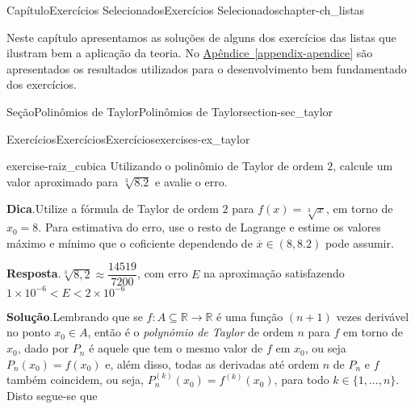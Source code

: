 \documentclass[oneside,10pt,]{book}
\newcommand{\blocktitlefont}{\relax}
\newcommand{\xreffont}{\relax}
\numberwithin{equation}{section}
\newcommand{\R}{\mathbb R}
\begin{document}
\begin{chapterptx}{Capítulo}{Exercícios Selecionados}{}{Exercícios Selecionados}{}{}{chapter-ch_listas}
\renewcommand*{\chaptername}{Capítulo}
\begin{introduction}{}%
Neste capítulo apresentamos as soluções de alguns dos exercícios das listas que ilustram bem a aplicação da teoria. No \hyperref[appendix-apendice]{Apêndice~{\xreffont\ref{appendix-apendice}}} são apresentados os resultados utilizados para o desenvolvimento bem fundamentado dos exercícios.%
\end{introduction}%
%
%
\typeout{************************************************}
\typeout{************************************************}
%
\begin{sectionptx}{Seção}{Polinômios de Taylor}{}{Polinômios de Taylor}{}{}{section-sec_taylor}
%
%
\typeout{************************************************}
\typeout{************************************************}
%
\begin{exercises-subsection-numberless}{Exercícios}{Exercícios}{}{Exercícios}{}{}{exercises-ex_taylor}
\begin{divisionexercise}{1}{}{}{exercise-raiz_cubica}%
Utilizando o polinômio de Taylor de ordem \(2\), calcule um valor aproximado para \(\sqrt[3]{8.2}\) e avalie o erro.%
\par\smallskip%
\noindent\textbf{\blocktitlefont Dica}.\hypertarget{hint-raiz_cubica-b}{}\quad{}Utilize a fórmula de Taylor de ordem \(2\) para \(f(x)=\sqrt[3]{x}\), em torno de \(x_0=8\). Para estimativa do erro, use o resto de Lagrange e estime os valores máximo e mínimo que o coficiente dependendo de \(\overline{x}\in(8,8.2)\) pode assumir.%
\par\smallskip%
\noindent\textbf{\blocktitlefont Resposta}.\hypertarget{answer-raiz_cubica-c}{}\quad{}\(\sqrt[3]{8,2}\approx \dfrac{14519}{7200}\), com erro \(E\) na aproximação satisfazendo \(1\times
10^{-6}<E <2\times 10^{-6}\)%
\par\smallskip%
\noindent\textbf{\blocktitlefont Solução}.\hypertarget{solution-raiz_cubica-d}{}\quad{}Lembrando que se \(f\colon A\subseteq\R\to\R\) é uma função \((n+1)\) vezes derivável no ponto \(x_0\in A\), então é o \emph{polynômio de Taylor} de ordem \(n\) para \(f\) em torno de \(x_0\), dado por \(P_n\) é aquele que tem o mesmo valor de \(f\) em \(x_0\), ou seja \(P_n(x_0)=f(x_0)\) e, além disso, todas as derivadas até ordem \(n\) de \(P_n\) e \(f\) também coincidem, ou seja, \(P_n^{(k)}(x_0)=f^{(k)}(x_0)\), para todo \(k\in\{1,\ldots,n\}\). Disto segue-se que%

\end{divisionexercise}
\end{exercises-subsection-numberless}
\end{sectionptx}
\end{chapterptx}
\end{document}
